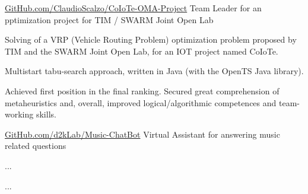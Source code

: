 



\begin{cventries}

	\cventry
		{\href{https://github.com/claudioscalzo/coiote-oma-project}{GitHub.com/ClaudioScalzo/CoIoTe-OMA-Project}}
		{Team Leader for an pptimization project for TIM / SWARM Joint Open Lab}
		{}
		{}
		{
			\begin{cvitems} %
				\item {Solving of a VRP (Vehicle Routing Problem) optimization problem proposed by TIM and the SWARM Joint Open Lab, for an IOT project named CoIoTe.}
				\item {Multistart tabu-search approach, written in Java (with the OpenTS Java library).}
				\item {Achieved first position in the final ranking. Secured great comprehension of metaheuristics and, overall, improved logical/algorithmic competences and team-working skills.}
			\end{cvitems}
		}

	\cventry
		{\href{https://github.com/D2KLab/music-chatbot}{GitHub.com/d2kLab/Music-ChatBot}}
		{Virtual Assistant for answering music related questions}
		{}
		{}
		{
			\begin{cvitems} %
				\item {...}
				\item {...}
			\end{cvitems}
		}
\end{cventries}
